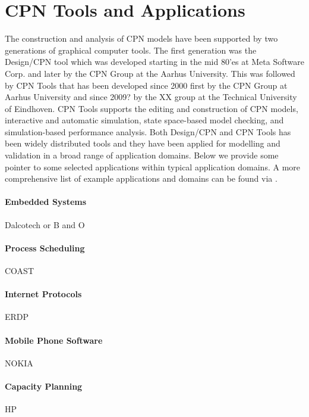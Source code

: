 
\section{CPN Tools and Applications}

The construction and analysis of CPN models have been supported by two
generations of graphical computer tools. The first generation was the
Design/CPN tool \cite{jensen:cpnmanual} which was developed starting
in the mid 80'es at Meta Software Corp. and later by the CPN Group at
the Aarhus University. This was followed by CPN Tools
\cite{cpntoolsweb} that has been developed since 2000 first by the CPN
Group at Aarhus University and since 2009? by the XX group at the
Technical University of Eindhoven. CPN Tools supports the editing and
construction of CPN models, interactive and automatic simulation,
state space-based model checking, and simulation-based performance
analysis. Both Design/CPN and CPN Tools has been widely distributed
tools and they have been applied for modelling and validation in a
broad range of application domains. Below we provide some pointer to
some selected applications within typical application domains. A more
comprehensive list of example applications and domains can be found
via \cite{cpnuse}.

\paragraph{Embedded Systems} Dalcotech or B and O

\paragraph{Process Scheduling} COAST

\paragraph{Internet Protocols} ERDP

\paragraph{Mobile Phone Software} NOKIA

\paragraph{Capacity Planning} HP

